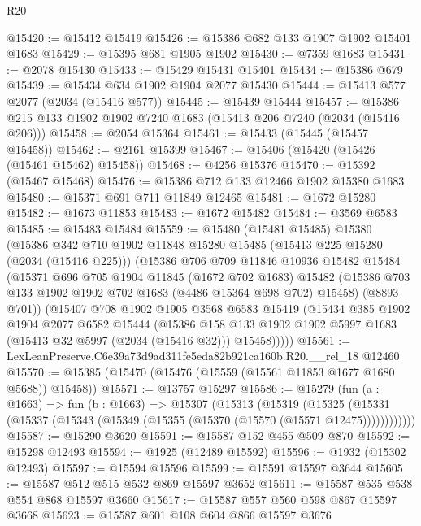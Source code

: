 \begin{lexlean}{R20}
\begin{coremodule}
@15420 := @15412 @15419
@15426 := @15386 @682 @133 @1907 @1902 @15401 @1683
@15429 := @15395 @681 @1905 @1902
@15430 := @7359 @1683
@15431 := @2078 @15430
@15433 := @15429 @15431 @15401
@15434 := @15386 @679
@15439 := @15434 @634 @1902 @1904 @2077 @15430
@15444 := @15413 @577 @2077 (@2034 (@15416 @577))
@15445 := @15439 @15444
@15457 := @15386 @215 @133 @1902 @1902 @7240 @1683 (@15413 @206 @7240 (@2034 (@15416 @206)))
@15458 := @2054 @15364
@15461 := @15433 (@15445 (@15457 @15458))
@15462 := @2161 @15399
@15467 := @15406 (@15420 (@15426 (@15461 @15462) @15458))
@15468 := @4256 @15376
@15470 := @15392 (@15467 @15468)
@15476 := @15386 @712 @133 @12466 @1902 @15380 @1683
@15480 := @15371 @691 @711 @11849 @12465
@15481 := @1672 @15280
@15482 := @1673 @11853
@15483 := @1672 @15482
@15484 := @3569 @6583
@15485 := @15483 @15484
@15559 := @15480
    (@15481 @15485)
    @15380
    (@15386
      @342
      @710
      @1902
      @11848
      @15280
      @15485
      (@15413 @225 @15280 (@2034 (@15416 @225)))
      (@15386
        @706
        @709
        @11846
        @10936
        @15482
        @15484
        (@15371
          @696
          @705
          @1904
          @11845
          (@1672 @702 @1683)
          @15482
          (@15386 @703 @133 @1902 @1902 @702 @1683 (@4486 @15364 @698 @702) @15458)
          (@8893 @701))
        (@15407
          @708
          @1902
          @1905
          @3568
          @6583
          @15419
          (@15434
            @385
            @1902
            @1904
            @2077
            @6582
            @15444
            (@15386
              @158
              @133
              @1902
              @1902
              @5997
              @1683
              (@15413 @32 @5997 (@2034 (@15416 @32)))
              @15458)))))
@15561 := LexLeanPreserve.C6e39a73d9ad311fe5eda82b921ca160b.R20.__rel_18 @12460
@15570 := @15385 (@15470 (@15476 (@15559 (@15561 @11853 @1677 @1680 @5688)) @15458))
@15571 := @13757 @15297
@15586 := @15279
    (fun (a : @1663) =>
    fun (b : @1663) =>
    @15307
      (@15313
        (@15319
          (@15325 (@15331 (@15337 (@15343 (@15349 (@15355 (@15370 (@15570 (@15571 @12475))))))))))))
@15587 := @15290 @3620
@15591 := @15587 @152 @455 @509 @870
@15592 := @15298 @12493
@15594 := @1925 (@12489 @15592)
@15596 := @1932 (@15302 @12493)
@15597 := @15594 @15596
@15599 := @15591 @15597 @3644
@15605 := @15587 @512 @515 @532 @869 @15597 @3652
@15611 := @15587 @535 @538 @554 @868 @15597 @3660
@15617 := @15587 @557 @560 @598 @867 @15597 @3668
@15623 := @15587 @601 @108 @604 @866 @15597 @3676

\end{coremodule}
\end{lexlean}
